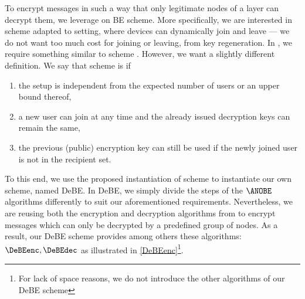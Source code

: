 To encrypt
messages in such a way that only legitimate nodes of a
layer can decrypt them, we leverage on \ac{BE} scheme.
More specifically, we are interested in  scheme adapted to  
setting, where devices can dynamically join and leave --- \ie we do not want too 
much cost for joining or leaving, \eg from key regeneration. 
In \name, we require something similar to  scheme
\cite{DynamicBroadcastEncryption}.
However, we want a slightly different definition.
We say that  scheme is  if
\begin{enumerate}
  \item the setup is independent from the expected number of users or an upper 
    bound thereof,
  \item a new user can join at any time and the already issued decryption keys 
    can remain the same,
  \item the previous (public) encryption key can still be used if the newly 
    joined user is not in the recipient set.
\end{enumerate}



To this end, we use the proposed instantiation of  scheme 
to instantiate our own scheme, named \ac{DeBE}. 
In \ac{DeBE}, we simply divide the
steps of the \(\ANOBE\) algorithms differently to suit our
aforementioned requirements. Nevertheless, we are reusing 
both the encryption and decryption algorithms from \cite{ANOBE} to 
encrypt messages which can only be decrypted by a predefined group of
nodes. As a result, our \ac{DeBE} scheme provides among others these algorithms:
\(\DeBEenc, \allowbreak \DeBEdec\) as illustrated in
\cref{DeBEenc}\footnote{For lack of space reasons, we do not introduce the other
algorithms of our \ac{DeBE} scheme}. 


